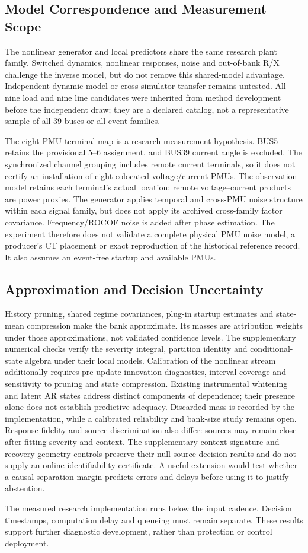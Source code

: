 \subsection{Model Correspondence and Measurement Scope}
The nonlinear generator and local predictors share the same research
plant family. Switched dynamics, nonlinear responses, noise and out-of-bank
R/X challenge the inverse model, but do not remove this shared-model
advantage. Independent dynamic-model or cross-simulator transfer remains
untested. All nine load and nine line candidates were inherited from
method development before the independent draw; they are a declared
catalog, not a representative sample of all 39 buses or all event families.

The eight-PMU terminal map is a research measurement hypothesis. BUS5
retains the provisional 5--6 assignment, and BUS39 current angle is excluded.
The synchronized channel grouping includes remote current terminals, so
it does not certify an installation of eight colocated voltage/current
PMUs. The observation model retains each terminal's actual location;
remote voltage--current products are power proxies.
The generator applies temporal and cross-PMU noise structure within each
signal family, but does not apply its archived cross-family factor
covariance. Frequency/ROCOF noise is added after phase estimation.
The experiment therefore does not validate a complete physical PMU noise
model, a producer's CT placement or exact reproduction of the historical
reference record. It also assumes an event-free startup and available PMUs.

\subsection{Approximation and Decision Uncertainty}
History pruning, shared regime covariances, plug-in startup estimates and
state-mean compression make the bank approximate. Its masses are
attribution weights under those approximations, not validated confidence
levels. The supplementary numerical checks verify the severity integral,
partition identity and conditional-state algebra under their local models.
Calibration of the nonlinear stream additionally requires pre-update
innovation diagnostics, interval coverage and sensitivity to pruning and
state compression. Existing instrumental whitening and latent AR states
address distinct components of dependence; their presence alone does not
establish predictive adequacy. Discarded mass is recorded by the
implementation, while a calibrated reliability and bank-size study remains
open.
Response fidelity and source discrimination also differ: sources may
remain close after fitting severity and context. The supplementary
context-signature and recovery-geometry controls preserve their null
source-decision results and do not supply an online identifiability
certificate. A useful extension would test whether a causal separation
margin predicts errors and delays before using it to justify abstention.

The measured research implementation runs below the input cadence.
Decision timestamps, computation delay and queueing must remain separate.
These results support further diagnostic development, rather than
protection or control deployment.
